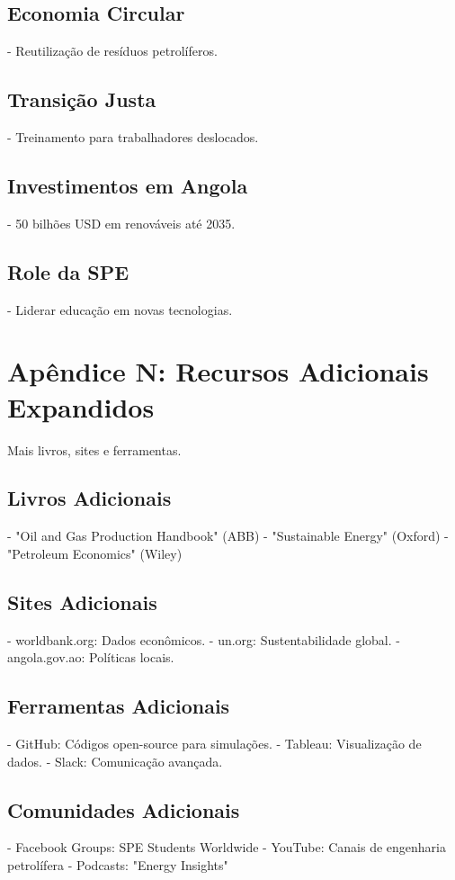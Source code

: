 \documentclass[12pt]{article}
\begin{document}
\subsection{Economia Circular}
- Reutilização de resíduos petrolíferos.

\subsection{Transição Justa}
- Treinamento para trabalhadores deslocados.

\subsection{Investimentos em Angola}
- 50 bilhões USD em renováveis até 2035.

\subsection{Role da SPE}
- Liderar educação em novas tecnologias.

\section{Apêndice N: Recursos Adicionais Expandidos}

Mais livros, sites e ferramentas.

\subsection{Livros Adicionais}
- "Oil and Gas Production Handbook" (ABB)
- "Sustainable Energy" (Oxford)
- "Petroleum Economics" (Wiley)

\subsection{Sites Adicionais}
- worldbank.org: Dados econômicos.
- un.org: Sustentabilidade global.
- angola.gov.ao: Políticas locais.

\subsection{Ferramentas Adicionais}
- GitHub: Códigos open-source para simulações.
- Tableau: Visualização de dados.
- Slack: Comunicação avançada.

\subsection{Comunidades Adicionais}
- Facebook Groups: SPE Students Worldwide
- YouTube: Canais de engenharia petrolífera
- Podcasts: "Energy Insights"
\end{document}

